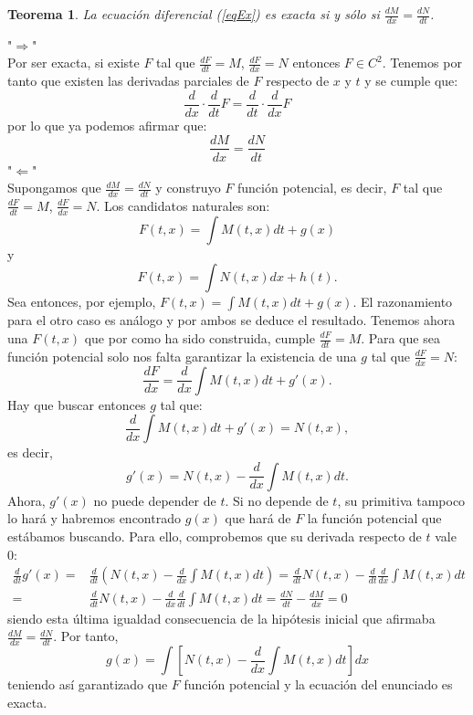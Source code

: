 \documentclass{article}
\makeatletter
\theoremstyle{theorem-style}  %
\newtheorem{theorem}{Teorema}[section]  %
\theoremstyle{definition-style}
\theoremstyle{example-style}
\renewenvironment{proof}[1][\proofname]{\par
	\pushQED{\qed}%
	\normalfont \topsep6\p@\@plus6\p@\relax
	\list{}{%
		\settowidth{\leftmargin}{\quad:\hskip\labelsep}%
		\setlength{\labelwidth}{0pt}%
		\setlength{\itemindent}{-\leftmargin}%
	}%
	\item[\hskip\labelsep\itshape#1\@addpunct{:}]\ignorespaces
}{%
	\popQED\endlist\@endpefalse
}
\makeatother
\begin{document}
\begin{theorem}
	La ecuación diferencial (\ref{eqEx}) es exacta si y sólo si $\frac{dM}{dx} = \frac{dN}{dt}$.
\end{theorem}
\begin{proof}
	"$\Rightarrow$" \\
	Por ser exacta, si existe $F$ tal que $\frac{dF}{dt} = M$, $\frac{dF}{dx} = N$ entonces $F \in C^2$. Tenemos por tanto que existen las derivadas parciales de $F$ respecto de $x$ y $t$ y se cumple que:
	\[ \frac{d}{dx} \cdot \frac{d}{dt} F = \frac{d}{dt} \cdot \frac{d}{dx} F\]
	por lo que ya podemos afirmar que:
	\[\frac{dM}{dx} = \frac{dN}{dt}\]
	"$\Leftarrow$" \\
	Supongamos que $\frac{dM}{dx} = \frac{dN}{dt}$  y construyo $F$ función potencial, es decir, $F$ tal que $\frac{dF}{dt} = M$, $\frac{dF}{dx} = N$. Los candidatos naturales son:
	\[F(t,x)=\int M(t, x)dt + g(x)\]
	y
	\[F(t,x)=\int N(t, x)dx + h(t).\]
	Sea entonces, por ejemplo, $F(t, x) = \int M(t, x)dt + g(x)$. El razonamiento para el otro caso es análogo y por ambos se deduce el resultado. Tenemos ahora una $ F(t,x) $ que por como ha sido construida, cumple $\frac{dF}{dt} = M$. Para que sea función potencial solo nos falta garantizar la existencia de una $g$ tal que $\frac{dF}{dx} = N$:
	\[\frac{dF}{dx} = \frac{d}{dx}\int M(t, x)dt + g'(x).\]
	Hay que buscar entonces $g$ tal que:
	\[\frac{d}{dx}\int M(t, x)dt + g'(x) = N(t, x),\]
	es decir, 
	\[g'(x) = N(t, x) - \frac{d}{dx}\int M(t, x)dt.\]
	Ahora, $ g'(x) $ no puede depender de $ t $. Si no depende de $ t $, su primitiva tampoco lo hará y habremos encontrado $g(x)  $ que hará de $ F $ la función potencial que estábamos buscando. Para ello, comprobemos que su derivada respecto de $ t $ vale 0:
	\begin{align*}
	\frac{d}{dt} g'(x)=	& \frac{d}{dt}\left( N(t, x) - \frac{d}{dx}\int M(t, x)dt\right)  =  \frac{d}{dt}N(t, x) -  \frac{d}{dt}\frac{d}{dx}\int M(t, x)dt  \\
		=& \frac{d}{dt}N(t, x) -  \frac{d}{dx}\frac{d}{dt}\int M(t, x)dt = 
		\frac{dN}{dt} - \frac{dM}{dx} = 0
	\end{align*}
	siendo esta última igualdad consecuencia de la hipótesis inicial que afirmaba $\frac{dM}{dx} = \frac{dN}{dt}$. Por tanto, 
	\[g(x) = \int\left[ N(t, x) - \frac{d}{dx}\int M(t, x)dt\right] dx\]
	teniendo así garantizado que $F$ función potencial y la ecuación del enunciado es exacta.
\end{proof}
\end{document}
